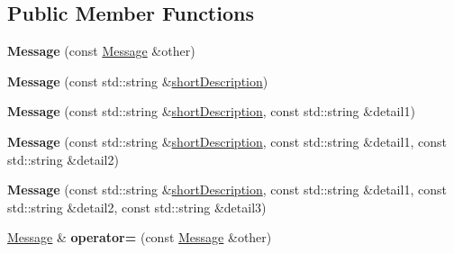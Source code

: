 \subsection*{Public Member Functions}
\begin{DoxyCompactItemize}
\item 
{\bfseries Message} (const \hyperlink{class_message}{Message} \&other)\hypertarget{class_message_ad253b20930e70257e2523bb9fc7d299c}{}\label{class_message_ad253b20930e70257e2523bb9fc7d299c}

\item 
{\bfseries Message} (const std\+::string \&\hyperlink{class_message_aa22497c35079e8619c516f693d1fd97f}{short\+Description})\hypertarget{class_message_aad17a05b7c2d5f1ef207f7150691a03a}{}\label{class_message_aad17a05b7c2d5f1ef207f7150691a03a}

\item 
{\bfseries Message} (const std\+::string \&\hyperlink{class_message_aa22497c35079e8619c516f693d1fd97f}{short\+Description}, const std\+::string \&detail1)\hypertarget{class_message_ab77d28861db855dadef024529aab07d8}{}\label{class_message_ab77d28861db855dadef024529aab07d8}

\item 
{\bfseries Message} (const std\+::string \&\hyperlink{class_message_aa22497c35079e8619c516f693d1fd97f}{short\+Description}, const std\+::string \&detail1, const std\+::string \&detail2)\hypertarget{class_message_ae8c66f7de0811d86765369a4c430bb6c}{}\label{class_message_ae8c66f7de0811d86765369a4c430bb6c}

\item 
{\bfseries Message} (const std\+::string \&\hyperlink{class_message_aa22497c35079e8619c516f693d1fd97f}{short\+Description}, const std\+::string \&detail1, const std\+::string \&detail2, const std\+::string \&detail3)\hypertarget{class_message_a65fcd0b70c65cf7b9b9de390386cef79}{}\label{class_message_a65fcd0b70c65cf7b9b9de390386cef79}

\item 
\hyperlink{class_message}{Message} \& {\bfseries operator=} (const \hyperlink{class_message}{Message} \&other)\hypertarget{class_message_a8003315e3355d1b0a5e3b7dcd5a0514c}{}\label{class_message_a8003315e3355d1b0a5e3b7dcd5a0514c}


\end{DoxyCompactItemize}

